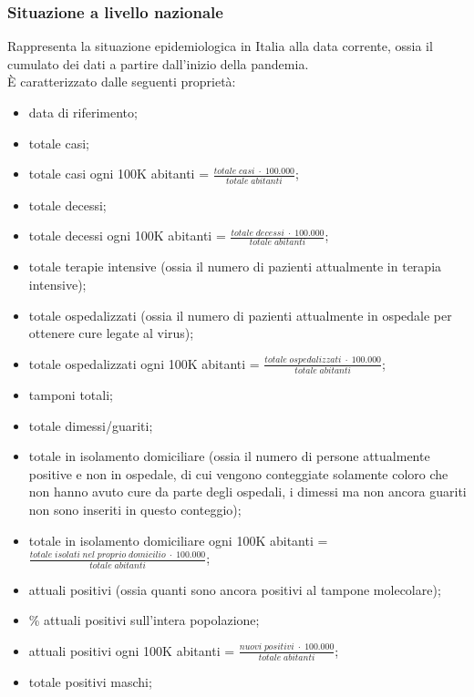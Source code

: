 \subsubsection{Situazione a livello nazionale}
\label{sss:situazione-livello-nazionale}
Rappresenta la situazione epidemiologica in Italia alla data corrente, ossia il cumulato dei dati a partire dall'inizio della pandemia.\\
È caratterizzato dalle seguenti proprietà:
\begin{itemize}
    \item data di riferimento;
    \item totale casi;
    \item totale casi ogni 100K abitanti = $\frac{totale \; casi \; \cdot \; 100.000}{totale \; abitanti}$;
    \item totale decessi;
    \item totale decessi ogni 100K abitanti = $\frac{totale \; decessi \; \cdot \; 100.000}{totale \; abitanti}$;
    \item totale terapie intensive (ossia il numero di pazienti attualmente in terapia intensive);
    \item totale ospedalizzati  (ossia il numero di pazienti attualmente in ospedale per ottenere cure legate al virus);
    \item totale ospedalizzati ogni 100K abitanti = $\frac{totale \; ospedalizzati \; \cdot \; 100.000}{totale \; abitanti}$;
    \item tamponi totali;
    \item totale dimessi/guariti;
    \item totale in isolamento domiciliare (ossia il numero di persone attualmente positive e non in ospedale, di cui vengono conteggiate solamente coloro che non hanno avuto cure da parte degli ospedali, i dimessi ma non ancora guariti non sono inseriti in questo conteggio);
    \item totale in isolamento domiciliare ogni 100K abitanti = $\frac{totale \; isolati \; nel \; proprio \; domicilio \; \cdot \; 100.000}{totale \; abitanti}$;
    \item attuali positivi (ossia quanti sono ancora positivi al tampone molecolare);
    \item \% attuali positivi sull'intera popolazione;
    \item attuali positivi ogni 100K abitanti = $\frac{nuovi \; positivi \; \cdot \; 100.000}{totale \; abitanti}$;
    \item totale positivi maschi;

\end{itemize}
